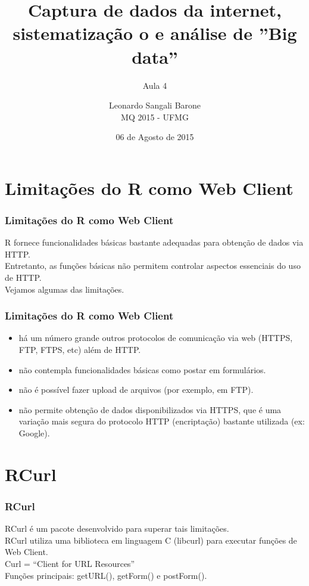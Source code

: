 \documentclass[11pt]{beamer}
\title{Captura de dados da internet, sistematização o e análise de ”Big data”}
\subtitle{Aula 4}
\author[Leonardo Sangali Barone]{Leonardo Sangali Barone\\MQ 2015 - UFMG}
\date[06 de Agosto de 2015]{06 de Agosto de 2015}
\begin{document}
\frame{\titlepage}

\section{Limitações do R como Web Client}

\begin{frame}
	\frametitle{Limitações do R como Web Client}
	R fornece funcionalidades básicas bastante adequadas para obtenção de 		dados via HTTP.
	\newline\\
	Entretanto, as funções básicas não permitem controlar aspectos essenciais 		do uso de HTTP.
	\newline\\
	Vejamos algumas das limitações.
\end{frame}

\begin{frame}
	\frametitle{Limitações do R como Web Client}
	\begin{itemize}
		\item há um número grande outros protocolos de comunicação via web 			(HTTPS, FTP, FTPS, etc) além de HTTP.
		\item não contempla funcionalidades básicas como postar em 
		formulários.
		\item não é possível fazer upload de arquivos (por exemplo, em FTP).
		\item não permite obtenção de dados disponibilizados via HTTPS, que é 			uma variação mais segura do protocolo HTTP (encriptação) bastante 			utilizada (ex: Google).
	\end{itemize}
\end{frame}

\section{RCurl}

\begin{frame}
	\frametitle{RCurl}
	RCurl é um pacote desenvolvido para superar tais limitações.
	\newline\\
	RCurl utiliza uma biblioteca em linguagem C (libcurl) para executar
	funções de Web Client.
	\newline\\
	Curl = ``Client for URL Resources''
	\newline\\
	Funções principais: getURL(), getForm() e postForm().
\end{frame}
\end{document}
